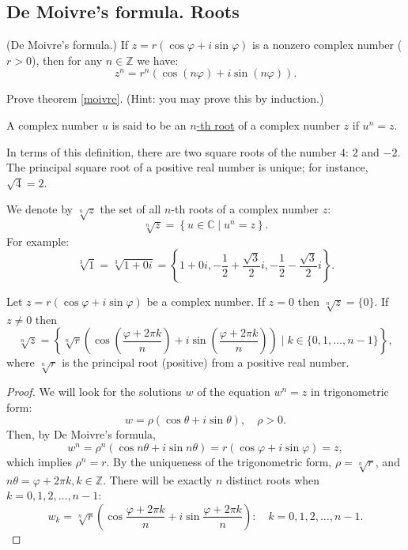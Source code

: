 \subsection{De Moivre’s formula. Roots}
\begin{theorem}\label{moivre}(De Moivre's formula.) If $z=r(\cos \varphi+i \sin \varphi)$ is a nonzero complex number ($r > 0$), then for any $n \in \mathbb{Z}$ we have:
$$
z^n=r^n(\cos (n \varphi)+i \sin (n \varphi)) .
$$
\end{theorem}

\begin{exercise}
    Prove theorem \ref{moivre}. (Hint: you may prove this by induction.)
\end{exercise}


\begin{definition}
A complex number $u$ is said to be an \underline{$n$-th root} of a complex number $z$ if $u^n=z$.
\end{definition}

\begin{remark}
In terms of this definition, there are two square roots of the number $4$: $2$ and $-2$. The principal square root of a positive real number is unique; for instance, $\sqrt{4} = 2$.
\end{remark}

We denote by $\sqrt[n]{z}$ the set of all $n$-th roots of a complex number $z$:
$$
\sqrt[n]{z} =\left\{u \in \mathbb{C} \mid u^n=z\right\} .
$$
For example:
$$
\sqrt[3]{1}=\sqrt[3]{1+0 i}=\left\{1+0 i,-\frac{1}{2}+\frac{\sqrt{3}}{2} i,-\frac{1}{2}-\frac{\sqrt{3}}{2} i\right\} .
$$

\begin{theorem}
Let $z = r(\cos\varphi + i\sin\varphi)$ be a complex number. If $z=0$ then $\sqrt[n]{z}=\{0\}$. If $z \neq 0$ then
$$
\sqrt[n]{z}=\left\{\sqrt[n]{r}\left(\cos \left(\frac{\varphi+2 \pi k}{n}\right)+i \sin \left(\frac{\varphi+2 \pi k}{n}\right)\right) \mid k \in\{0,1, \ldots, n-1\}\right\},
$$
where $\sqrt[n]{r}$ is the principal root (positive) from a positive real number.
\end{theorem}

\begin{proof}
We will look for the solutions $w$ of the equation $w^n=z$ in trigonometric form:
$$
w=\rho(\cos \theta+i \sin \theta), \quad \rho>0 .
$$
Then, by De Moivre's formula,
$$
w^n=\rho^n(\cos n \theta+i \sin n \theta)=r(\cos \varphi+i \sin \varphi)=z,
$$
which implies $\rho^n=r$. By the uniqueness of the trigonometric form, $\rho=\sqrt[n]{r}$, and $n \theta=\varphi+2 \pi k, k \in \mathbb{Z}$. There will be exactly $n$ distinct roots when $k=0,1,2, \ldots, n-1$:
$$
w_k=\sqrt[n]{r}\left(\cos \frac{\varphi+2 \pi k}{n}+i \sin \frac{\varphi+2 \pi k}{n}\right): \quad k=0,1,2, \ldots, n-1.    
$$
\end{proof}

